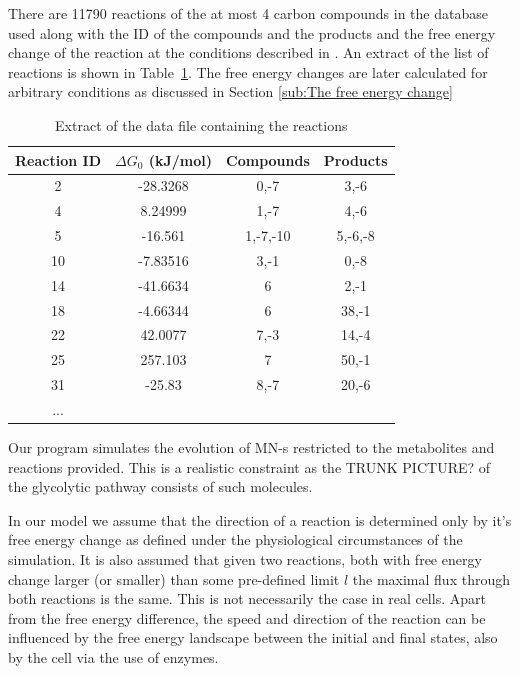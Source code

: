 \documentclass[a4paper,12pt]{article}
\begin{document}
	There are 11790 reactions of the at most 4 carbon compounds in the database used along with the ID of the compounds and the products and the free energy change of the reaction at the conditions described in \cite{BartekLower}. An extract of the list of reactions is shown in Table~\ref{tab:reacs}. The free energy changes are later calculated for arbitrary conditions as discussed in Section \ref{sub:The free energy change}

	\begin{table}[htpb]
		\centering
		\begin{tabular}{cccc}
		Reaction ID &	$\Delta G_0$ (kJ/mol) & Compounds & Products \\ \hline
		2 &	-28.3268           & 0,-7      & 3,-6     \\
		4 &	8.24999            & 1,-7      & 4,-6     \\
		5 &	-16.561            & 1,-7,-10  & 5,-6,-8  \\
		10 &	-7.83516           & 3,-1      & 0,-8     \\
		14 &	-41.6634           & 6         & 2,-1     \\
		18 &	-4.66344           & 6         & 38,-1    \\
		22 &	42.0077            & 7,-3      & 14,-4    \\
		25 &	257.103            & 7         & 50,-1    \\
		31 &	-25.83             & 8,-7      & 20,-6    \\
		...&           &         
		\end{tabular}
		\caption{Extract of the data file containing the reactions}
		\label{tab:reacs}
	\end{table}
	
	Our program simulates the evolution of MN-s restricted to the metabolites and reactions provided. This is a realistic constraint as the TRUNK PICTURE? of the glycolytic pathway consists of such molecules.

	In our model we assume that the direction of a reaction is determined only by it's free energy change as defined under the physiological circumstances of the simulation. It is also assumed that given two reactions, both with free energy change larger (or smaller) than some pre-defined limit $l$ the maximal flux through both reactions is the same. This is not necessarily the case in real cells. Apart from the free energy difference, the speed and direction of the reaction can be influenced by the free energy landscape between the initial and final states, also by the cell via the use of enzymes. 
\end{document}
